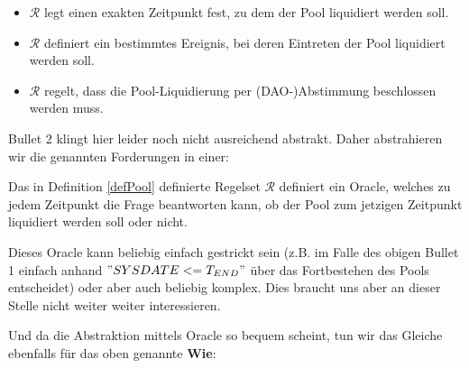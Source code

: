 \begin{itemize}
  \item $\mathcal{R}$ legt einen exakten Zeitpunkt fest, zu dem der Pool liquidiert werden soll.
  \item $\mathcal{R}$ definiert ein bestimmtes Ereignis, bei deren Eintreten der Pool liquidiert werden soll.
  \item $\mathcal{R}$ regelt, dass die Pool-Liquidierung per (DAO-)Abstimmung beschlossen werden muss.
\end{itemize}

\vspace{0.3cm}

Bullet 2 klingt hier leider noch nicht ausreichend abstrakt. Daher abstrahieren wir die genannten Forderungen in einer:

\vspace{0.2cm}

\begin{Fazit}

Das in Definition \ref{defPool} definierte Regelset $\mathcal{R}$ definiert ein Oracle, welches zu jedem Zeitpunkt die Frage beantworten kann, ob der Pool zum jetzigen Zeitpunkt liquidiert werden soll oder nicht. 

Dieses Oracle kann beliebig einfach gestrickt sein (z.B. im Falle des obigen Bullet 1 einfach anhand $"SYSDATE <= T_{END}"$ über das Fortbestehen des Pools entscheidet) oder aber auch beliebig komplex. Dies braucht uns aber an dieser Stelle nicht weiter weiter interessieren. 

\end{Fazit}

\vspace{0.3cm}

Und da die Abstraktion mittels Oracle so bequem scheint, tun wir das Gleiche ebenfalls für das oben genannte \textbf{Wie}:

\vspace{0.2cm}

